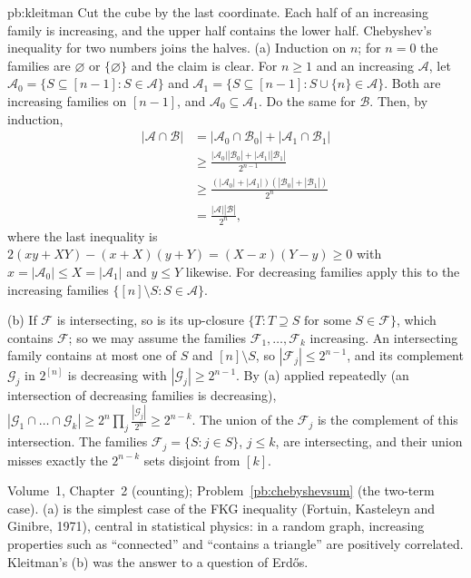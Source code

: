 \begin{solution}{pb:kleitman}
\idea Cut the cube by the last coordinate. Each half of an increasing family is increasing, and the upper half contains the lower half. Chebyshev's inequality for two numbers joins the halves.
\writeup (a) Induction on $n$; for $n=0$ the families are $\varnothing$ or $\{\varnothing\}$ and the claim is clear. For $n\ge1$ and an increasing $\mathcal A$, let
$\mathcal A_0=\{S\subseteq[n-1]:S\in\mathcal A\}$ and $\mathcal A_1=\{S\subseteq[n-1]:S\cup\{n\}\in\mathcal A\}$. Both are increasing families on $[n-1]$, and $\mathcal A_0\subseteq\mathcal A_1$. Do
the same for $\mathcal B$. Then, by induction,
\[
\begin{aligned}
|\mathcal A\cap\mathcal B|&=|\mathcal A_0\cap\mathcal B_0|+|\mathcal A_1\cap\mathcal B_1|\\
&\ge\frac{|\mathcal A_0||\mathcal B_0|+|\mathcal A_1||\mathcal B_1|}{2^{n-1}}\\
&\ge\frac{(|\mathcal A_0|+|\mathcal A_1|)(|\mathcal B_0|+|\mathcal B_1|)}{2^n}\\
&=\frac{|\mathcal A||\mathcal B|}{2^n},
\end{aligned}
\]
where the last inequality is $2(xy+XY)-(x+X)(y+Y)=(X-x)(Y-y)\ge0$ with $x=|\mathcal A_0|\le X=|\mathcal A_1|$ and $y\le Y$ likewise. For decreasing
families apply this to the increasing families $\{[n]\setminus S:S\in\mathcal A\}$.

(b) If $\mathcal F$ is intersecting, so is its up-closure $\{T:T\supseteq S\text{ for some }S\in\mathcal F\}$, which contains $\mathcal F$; so we may assume the
families $\mathcal F_1,\dots,\mathcal F_k$ increasing. An intersecting family contains at most one of $S$ and $[n]\setminus S$, so $|\mathcal F_j|\le2^{n-1}$, and its complement
$\mathcal G_j$ in $2^{[n]}$ is decreasing with $|\mathcal G_j|\ge2^{n-1}$. By (a) applied repeatedly (an intersection of decreasing families is decreasing),
$|\mathcal G_1\cap\dots\cap\mathcal G_k|\ge2^n\prod_j\frac{|\mathcal G_j|}{2^n}\ge2^{n-k}$. The union of the $\mathcal F_j$ is the complement of this intersection. The families
$\mathcal F_j=\{S:j\in S\}$, $j\le k$, are intersecting, and their union misses exactly the $2^{n-k}$ sets disjoint from $[k]$.

\tools Volume~1, Chapter~2 (counting); Problem~\ref{pb:chebyshevsum} (the two-term case).
\leads (a) is the simplest case of the FKG inequality (Fortuin, Kasteleyn and Ginibre, 1971), central in statistical physics: in a
random graph, increasing properties such as ``connected'' and ``contains a triangle'' are positively correlated. Kleitman's (b)
was the answer to a question of Erdős.
\end{solution}

